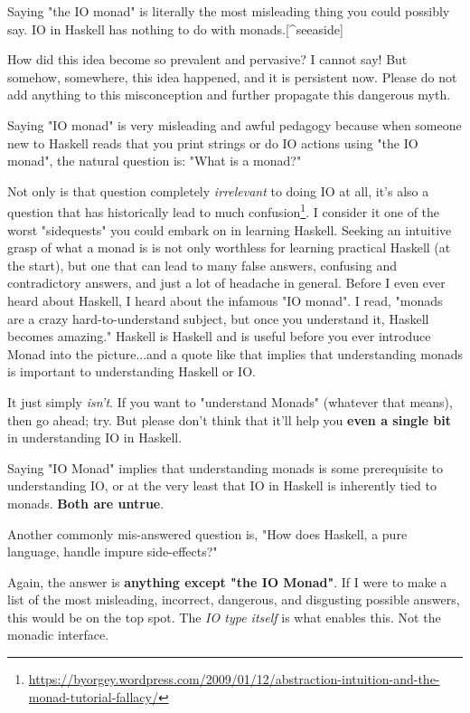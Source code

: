 \documentclass[]{article}
\renewcommand{\href}[2]{#2\footnote{\url{#1}}}
\begin{document}
Saying "the IO monad" is literally the most misleading thing you could possibly
say. IO in Haskell has nothing to do with monads.{[}\^{}seeaside{]}

How did this idea become so prevalent and pervasive? I cannot say! But somehow,
somewhere, this idea happened, and it is persistent now. Please do not add
anything to this misconception and further propagate this dangerous myth.

Saying "IO monad" is very misleading and awful pedagogy because when someone new
to Haskell reads that you print strings or do IO actions using "the IO monad",
the natural question is: "What is a monad?"

Not only is that question completely \emph{irrelevant} to doing IO at all, it's
also a question that has
\href{https://byorgey.wordpress.com/2009/01/12/abstraction-intuition-and-the-monad-tutorial-fallacy/}{historically
lead to much confusion}. I consider it one of the worst "sidequests" you could
embark on in learning Haskell. Seeking an intuitive grasp of what a monad is is
not only worthless for learning practical Haskell (at the start), but one that
can lead to many false answers, confusing and contradictory answers, and just a
lot of headache in general. Before I even ever heard about Haskell, I heard
about the infamous "IO monad". I read, "monads are a crazy hard-to-understand
subject, but once you understand it, Haskell becomes amazing." Haskell is
Haskell and is useful before you ever introduce Monad into the picture...and a
quote like that implies that understanding monads is important to understanding
Haskell or IO.

It just simply \emph{isn't}. If you want to "understand Monads" (whatever that
means), then go ahead; try. But please don't think that it'll help you
\textbf{even a single bit} in understanding IO in Haskell.

Saying "IO Monad" implies that understanding monads is some prerequisite to
understanding IO, or at the very least that IO in Haskell is inherently tied to
monads. \textbf{Both are untrue}.

Another commonly mis-answered question is, "How does Haskell, a pure language,
handle impure side-effects?"

Again, the answer is \textbf{anything except "the IO Monad"}. If I were to make
a list of the most misleading, incorrect, dangerous, and disgusting possible
answers, this would be on the top spot. The \emph{IO type itself} is what
enables this. Not the monadic interface.
\end{document}
